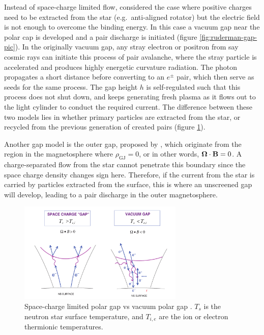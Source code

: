 Instead of space-charge limited flow, \citet{ruderman_theory_1975} considered
the case where positive charges need to be extracted from the star (e.g.\
anti-aligned rotator) but the electric field is not enough to overcome the
binding energy. In this case a vacuum gap near the polar cap is developed and a
pair discharge is initiated (figure \ref{fig:ruderman-gap-pic}). In the
originally vacuum gap, any stray electron or positron from say cosmic rays can
initiate this process of pair avalanche, where the stray particle is accelerated
and produces highly energetic curvature radiation. The photon propagates a short
distance before converting to an $e^{\pm}$ pair, which then serve as seeds for
the same process. The gap height $h$ is self-regulated such that this process
does not shut down, and keeps generating fresh plasma as it flows out to the
light cylinder to conduct the required current. The difference between these two
models lies in whether primary particles are extracted from the star, or
recycled from the previous generation of created pairs (figure
\ref{fig:polar-gaps}).

Another gap model is the outer gap, proposed by \citet{cheng_energetic_1986},
which originate from the region in the magnetosphere where $\rho_\mathrm{GJ} =
0$, or in other words, $\bm{\Omega}\cdot \mathbf{B} = 0$. A charge-separated flow from
the star cannot penetrate this boundary since the space charge density changes
sign here. Therefore, if the current from the star is carried by particles
extracted from the surface, this is where an unscreened gap will develop,
leading to a pair discharge in the outer magnetosphere.

\begin{figure}[h]
  \centering
  \includegraphics[width=0.7\textwidth]{pics/intro/polar-gaps.png}
  \caption[Space-charge limited polar gap and vacuum polar gap.]{Space-charge
    limited polar gap vs vacuum polar gap \citep{harding_high-energy_2009}.
    $T_{s}$ is the neutron star surface temperature, and $T_{i,e}$ are the ion
    or electron thermionic temperatures.}
  \label{fig:polar-gaps}
\end{figure}


